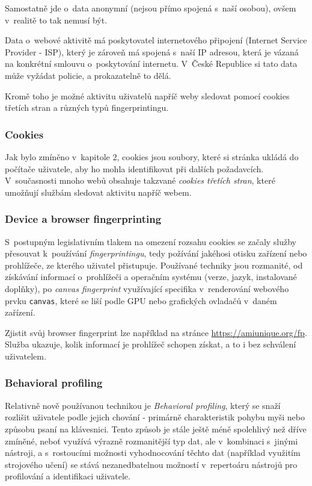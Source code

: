 Samostatně jde o~data anonymní (nejsou přímo spojená s~naší osobou), ovšem v~realitě to tak nemusí být.

Data o~webové aktivitě má poskytovatel internetového připojení (Internet Service Provider - ISP), který je zároveň má spojená s~naší IP adresou, která je vázaná na konkrétní smlouvu o~poskytování internetu. V~České Republice si tato data může vyžádat policie, a prokazatelně to dělá\citep{policie-isp}.

Kromě toho je možné aktivitu uživatelů napříč weby sledovat pomocí cookies třetích stran a různých typů fingerprintingu.
\subsubsection{Cookies}
Jak bylo zmíněno v~kapitole 2, cookies jsou soubory, které si stránka ukládá do počítače uživatele, aby ho mohla identifikovat při dalších požadavcích. V~současnosti mnoho webů obsahuje takzvané \textit{cookies třetích stran}, které umožňují službám sledovat aktivitu napříč webem.

\subsubsection{Device a browser fingerprinting}
S~postupným legislativním tlakem na omezení rozsahu cookies se začaly služby přesouvat k~používání \textit{fingerprintingu}, tedy požívání jakéhosi otisku zařízení nebo prohlížeče, ze kterého uživatel přistupuje. Používané techniky jsou rozmanité, od získávání informací o~prohlížeči a operačním systému (verze, jazyk, instalované doplňky), po \textit{canvas fingerprint} využívající specifika v~renderování webového prvku \verb|canvas|, které se liší podle GPU nebo grafických ovladačů v~daném zařízení.  

Zjistit svůj browser fingerprint lze například na stránce \url{https://amiunique.org/fp}. Služba ukazuje, kolik informací je prohlížeč schopen získat, a to i bez schválení uživatelem. 

\subsubsection{Behavioral profiling}
Relativně nově používanou technikou je \textit{Behavioral profiling}, který se snaží rozlišit uživatele podle jejich chování - primárně charakteristik pohybu myši nebo způsobu psaní na klávesnici\citep{behavioral-profiling}\citep{mouse-behavioral-biometrics}\citep{digital-behavior-fingerprint}. Tento způsob je stále ještě méně spolehlivý než dříve zmíněné, neboť využívá výrazně rozmanitější typ dat, ale v~kombinaci s~jinými nástroji, a s~rostoucími možnosti vyhodnocování těchto dat (například využitím strojového učení) se stává nezanedbatelnou možností v~repertoáru nástrojů pro profilování a identifikaci uživatele.

